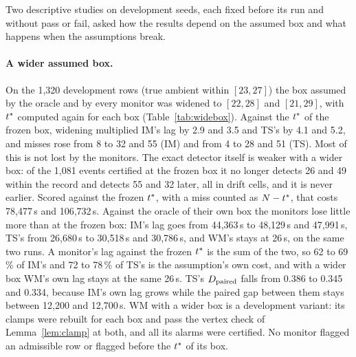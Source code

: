 Two descriptive studies on development seeds, each fixed before its run and without pass or fail, asked how the
results depend on the assumed box and what happens when the assumptions break.

\paragraph{A wider assumed box.} On the 1,320 development rows (true ambient within $[23, 27]$) the box assumed by the
oracle and by every monitor was widened to $[22, 28]$ and $[21, 29]$, with $t^{\ast}$ computed again for each box
(Table~\ref{tab:widebox}). Against the $t^{\ast}$ of the frozen box, widening multiplied IM's lag by 2.9 and 3.5 and
TS's by 4.1 and 5.2, and misses rose from 8 to 32 and 55 (IM) and from 4 to 28 and 51 (TS). Most of this is not lost
by the monitors. The exact detector itself is weaker with a wider box: of the 1,081 events certified at the frozen box
it no longer detects 26 and 49 within the record and detects 55 and 32 later, all in drift cells, and it is never
earlier. Scored against the frozen $t^{\ast}$, with a miss counted as $N-t^{\ast}$, that costs 78,477\,s and 106,732\,s.
Against the oracle of their own box the monitors lose little more than at the frozen box: IM's lag goes from
44,363\,s to 48,129\,s and 47,991\,s, TS's from 26,680\,s to 30,518\,s and 30,786\,s, and WM's stays at 26\,s, on the
same two runs. A monitor's lag against the frozen $t^{\ast}$ is the sum of the two, so 62 to 69\,\% of IM's and 72 to
78\,\% of TS's is the assumption's own cost, and with a wider box WM's own lag stays at the same 26\,s. TS's $D_{\mathrm{paired}}$ falls from 0.386 to 0.345 and 0.334, because IM's own lag grows while the paired gap between them stays
between 12,200 and 12,700\,s. WM with a wider box is a development variant: its clamps were rebuilt for each box and
pass the vertex check of Lemma~\ref{lem:clamp} at both, and all its alarms were certified. No monitor flagged an
admissible row or flagged before the $t^{\ast}$ of its box.

